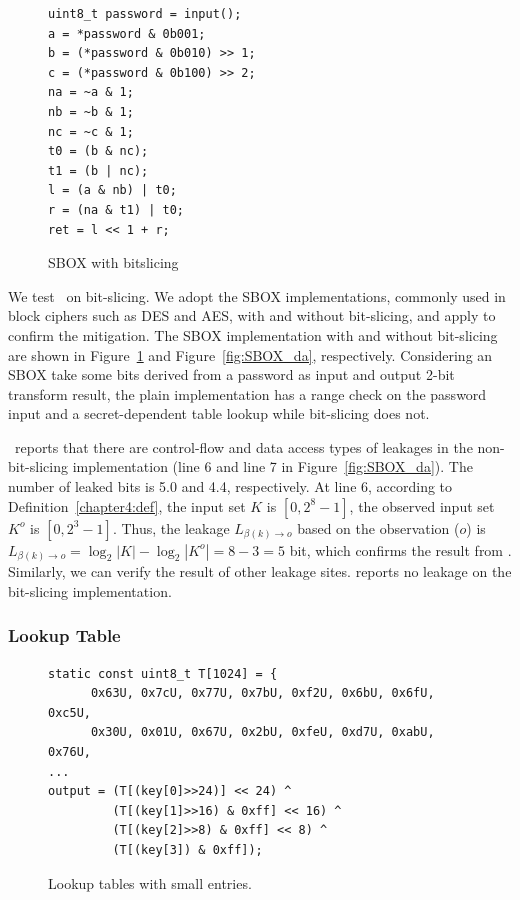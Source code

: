 \begin{figure}[h!]
    \centering
    \begin{lstlisting}[xleftmargin=.2\textwidth, xrightmargin=.0\textwidth, frame=none]
uint8_t password = input();
a = *password & 0b001;
b = (*password & 0b010) >> 1;
c = (*password & 0b100) >> 2;
na = ~a & 1;
nb = ~b & 1;
nc = ~c & 1;
t0 = (b & nc);
t1 = (b | nc);
l = (a & nb) | t0;
r = (na & t1) | t0;
ret = l << 1 + r;
\end{lstlisting}
\caption{SBOX with bitslicing}
\label{fig:SBOX_bitslicing}
\end{figure}
We test \tool\ on bit-slicing. We adopt the SBOX
implementations, commonly used in block ciphers such as DES and AES, with and
without bit-slicing, and apply \tool{} to confirm the mitigation. The SBOX implementation with and without bit-slicing are shown in Figure~\ref{fig:SBOX_bitslicing} and Figure~\ref{fig:SBOX_da}, respectively. Considering an SBOX take some bits derived from a password as input and output 2-bit transform result, the plain implementation
has a range check on the password input and a secret-dependent table lookup while bit-slicing does not.

\tool\ reports that there are control-flow and data access types of leakages
in the non-bit-slicing implementation (line 6 and line 7 in Figure~\ref{fig:SBOX_da}). The number of leaked bits is
5.0 and 4.4, respectively. At line 6, according to Definition~\ref{chapter4:def}, the
input set $K$ is $[0,2^8-1]$, the observed input set $K^o$ is $[0,2^3-1]$. Thus,
the leakage $L_{\beta(k)\rightarrow o}$ based on the observation ($o$) is
$L_{\beta(k)\rightarrow o} = \log_2{|K|} - \log_2{|K^o|} = 8-3 = 5$ bit, which
confirms the result from \tool. Similarly, we can verify the result of other
leakage sites. \tool{} reports no leakage on the bit-slicing implementation.


\subsubsection*{Lookup Table}
\begin{figure}[h]
\centering
    \begin{lstlisting}[xleftmargin=.05\textwidth, xrightmargin=.05\textwidth, frame=none]
static const uint8_t T[1024] = {
      0x63U, 0x7cU, 0x77U, 0x7bU, 0xf2U, 0x6bU, 0x6fU, 0xc5U,
      0x30U, 0x01U, 0x67U, 0x2bU, 0xfeU, 0xd7U, 0xabU, 0x76U,
...
output = (T[(key[0]>>24)] << 24) ^
         (T[(key[1]>>16) & 0xff] << 16) ^
         (T[(key[2]>>8) & 0xff] << 8) ^
         (T[(key[3]) & 0xff]);
\end{lstlisting}
  \caption{Lookup tables with small entries.}\label{fig:chapter4:small_lookup}
\end{figure}

